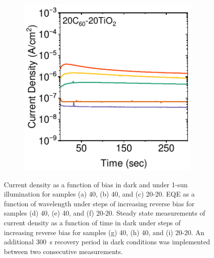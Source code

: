 \begin{figure}[ht!]
\begin{subfigure}[b]{0.32\textwidth}
        \caption{}
    \end{subfigure}
    \hfill
    \begin{subfigure}[b]{0.32\textwidth}
        \centering
        \includegraphics[width=\textwidth]{chapters/transport_layers/images/StaticJV_20_20.pdf}
        \caption{}
    \end{subfigure}

    \caption{Current density as a function of bias in dark and under 1-sun illumination for samples (a) 40, (b) 40, and (c) 20-20. EQE as a function of wavelength under steps of increasing reverse bias for samples (d) 40, (e) 40, and (f) 20-20. Steady state measurements of current density as a function of time in dark under steps of increasing reverse bias for samples (g) 40, (h) 40, and (i) 20-20. An additional 300~s recovery period in dark conditions was implemented between two consecutive measurements.}
    \label{fig:etl_opt:dynamicjv_eqe_staticjv}
\end{figure}

